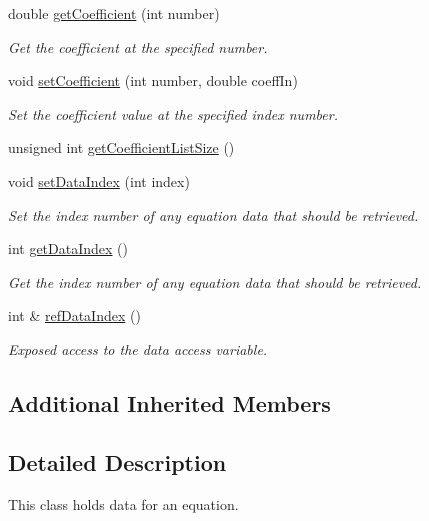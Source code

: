 \begin{DoxyCompactItemize}
double \hyperlink{classosea_1_1ofreq_1_1_equation_a6aa77458d50e80de2a31708756c7925b}{get\-Coefficient} (int number)
\begin{DoxyCompactList}\small\item\em Get the coefficient at the specified number. \end{DoxyCompactList}\item 
void \hyperlink{classosea_1_1ofreq_1_1_equation_a96dd6f24624703a1ff3ffb4d19a76582}{set\-Coefficient} (int number, double coeff\-In)
\begin{DoxyCompactList}\small\item\em Set the coefficient value at the specified index number. \end{DoxyCompactList}\item 
unsigned int \hyperlink{classosea_1_1ofreq_1_1_equation_aa3ceaac689d9cfef1a1b3123d8ec4027}{get\-Coefficient\-List\-Size} ()
\item 
void \hyperlink{classosea_1_1ofreq_1_1_equation_aa9e40c1cc6fb3cb030e9956663025a87}{set\-Data\-Index} (int index)
\begin{DoxyCompactList}\small\item\em Set the index number of any equation data that should be retrieved. \end{DoxyCompactList}\item 
int \hyperlink{classosea_1_1ofreq_1_1_equation_ac5fd13eba76ddbbf4813823fad4166e2}{get\-Data\-Index} ()
\begin{DoxyCompactList}\small\item\em Get the index number of any equation data that should be retrieved. \end{DoxyCompactList}\item 
int \& \hyperlink{classosea_1_1ofreq_1_1_equation_a5964477a42f3941a968f249b89742d73}{ref\-Data\-Index} ()
\begin{DoxyCompactList}\small\item\em Exposed access to the data access variable. \end{DoxyCompactList}\end{DoxyCompactItemize}
\subsection*{Additional Inherited Members}


\subsection{Detailed Description}
This class holds data for an equation. 


